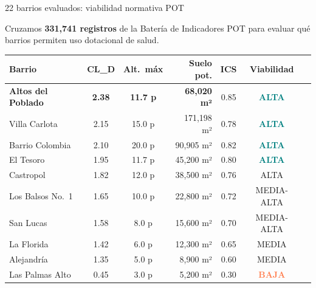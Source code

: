 \documentclass[aspectratio=169, 11pt]{beamer}
\newcommand{\highlight}[1]{\textcolor{teal}{\textbf{#1}}}
\newcommand{\danger}[1]{\textcolor{coral}{\textbf{#1}}}
\begin{document}
\begin{frame}{22 barrios evaluados: viabilidad normativa POT}

{\small Cruzamos \textbf{331,741 registros} de la Batería de Indicadores POT para evaluar qué barrios permiten uso dotacional de salud.}

\vspace{6pt}
{\scriptsize
\begin{tabular}{@{}p{3.2cm}ccrccl@{}}
\toprule
\textbf{Barrio} & \textbf{CL\_D} & \textbf{Alt.\ máx} & \textbf{Suelo pot.} & \textbf{ICS} & \textbf{Viabilidad} \\
\midrule
\rowcolor{teal!10}
\textbf{Altos del Poblado} & \textbf{2.38} & \textbf{11.7 p} & \textbf{68,020 m²} & 0.85 & \highlight{ALTA} \\
\rowcolor{teal!8}
Villa Carlota & 2.15 & 15.0 p & 171,198 m² & 0.78 & \highlight{ALTA} \\
\rowcolor{teal!8}
Barrio Colombia & 2.10 & 20.0 p & 90,905 m² & 0.82 & \highlight{ALTA} \\
\rowcolor{teal!6}
El Tesoro & 1.95 & 11.7 p & 45,200 m² & 0.80 & \highlight{ALTA} \\
\rowcolor{teal!6}
Castropol & 1.82 & 12.0 p & 38,500 m² & 0.76 & ALTA \\
Los Balsos No.\ 1 & 1.65 & 10.0 p & 22,800 m² & 0.72 & MEDIA-ALTA \\
San Lucas & 1.58 & 8.0 p & 15,600 m² & 0.70 & MEDIA-ALTA \\
La Florida & 1.42 & 6.0 p & 12,300 m² & 0.65 & MEDIA \\
Alejandría & 1.35 & 5.0 p & 8,900 m² & 0.60 & MEDIA \\
\rowcolor{coral!6}
Las Palmas Alto & 0.45 & 3.0 p & 5,200 m² & 0.30 & \danger{BAJA} \\
\bottomrule
\end{tabular}
}


\end{frame}
\end{document}
